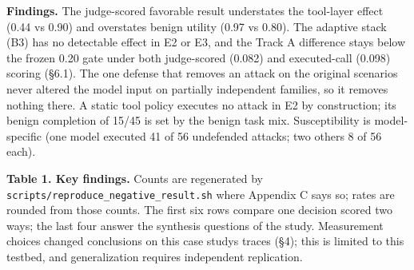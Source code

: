 \documentclass[10pt]{article}
\begin{document}
\textbf{Findings.} The judge-scored favorable result understates the tool-layer effect (0.44 vs 0.90) and overstates benign utility (0.97 vs 0.80). The adaptive stack (B3) has no detectable effect in E2 or E3, and the Track A difference stays below the frozen 0.20 gate under both judge-scored (0.082) and executed-call (0.098) scoring (§6.1). The one defense that removes an attack on the original scenarios never altered the model input on partially independent families, so it removes nothing there. A static tool policy executes no attack in E2 by construction; its benign completion of 15/45 is set by the benign task mix. Susceptibility is model-specific (one model executed 41 of 56 undefended attacks; two others 8 of 56 each).

\textbf{Table 1. Key findings.} Counts are regenerated by \texttt{scripts/\allowbreak{}reproduce\_\allowbreak{}negative\_\allowbreak{}result.sh} where Appendix C says so; rates are rounded from those counts. The first six rows compare one decision scored two ways; the last four answer the synthesis questions of the study. Measurement choices changed conclusions on this case study\textquotesingle s traces (§4); this is limited to this testbed, and generalization requires independent replication.


\end{document}
